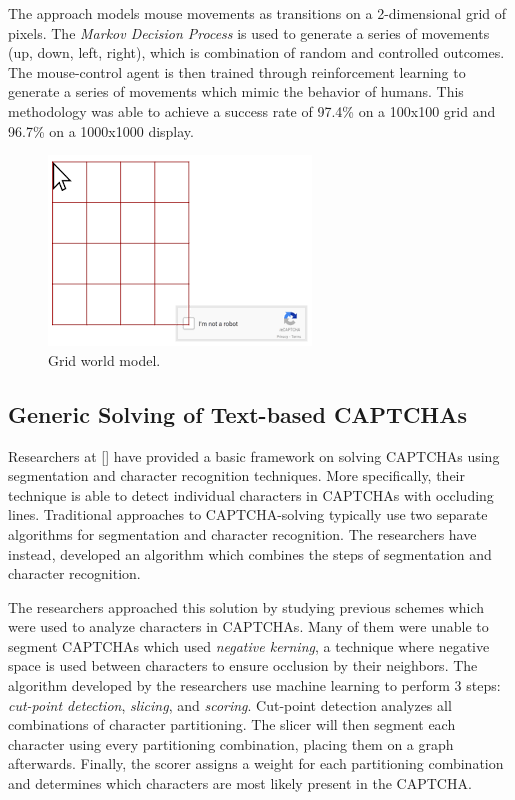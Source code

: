 \documentclass[11pt,conference]{IEEEtran}
\begin{document}
The approach models mouse movements as transitions on a 2-dimensional grid
of pixels. The \emph{Markov Decision Process} is used to generate a series of
movements (up, down, left, right), which is combination of random and controlled
outcomes. The mouse-control agent is then trained through reinforcement
learning to generate a series of movements which mimic the behavior of humans.
This methodology was able to achieve a success rate of 97.4\% on a 100x100
grid and 96.7\% on a 1000x1000 display.

\begin{figure}[htbp]
    \centerline{\includegraphics[scale=0.5]{images/grid-world.png}}
    \caption{Grid world model.}
    \label{figure}
\end{figure}

\subsection{Generic Solving of Text-based CAPTCHAs}
Researchers at [] have provided a basic framework on solving CAPTCHAs using
segmentation and character recognition techniques. More specifically, their
technique is able to detect individual characters in CAPTCHAs with occluding
lines. Traditional approaches to CAPTCHA-solving typically use two separate
algorithms for segmentation and character recognition. The researchers have
instead, developed an algorithm which combines the steps of segmentation and character
recognition.

The researchers approached this solution by studying previous schemes which
were used to analyze characters in CAPTCHAs. Many of them were unable to
segment CAPTCHAs which used \emph{negative kerning}, a technique
where negative space is used between characters to ensure occlusion 
by their neighbors. The algorithm developed by the researchers use machine
learning to perform 3 steps: \emph{cut-point detection}, \emph{slicing}, and
\emph{scoring}.
Cut-point detection analyzes all combinations of character partitioning. The
slicer will then segment each character using every partitioning combination,
placing them on a graph afterwards. Finally, the scorer assigns a weight for
each partitioning combination and determines which characters are most likely
present in the CAPTCHA.
\end{document}
